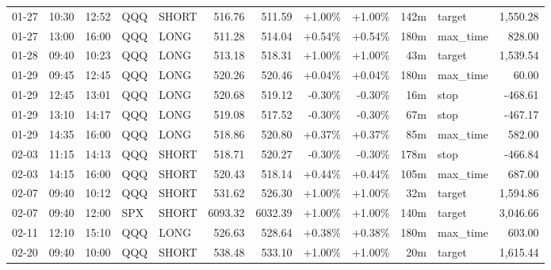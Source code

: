 \documentclass[11pt,a4paper,twoside]{article}
\begin{document}
\begin{center}
\begin{longtable}{>{\color{txtmain}}l l l l l r r r r r >{\color{txtmain}}l r}
01-27 & 10:30 & 12:52 & QQQ & SHORT & 516.76 & 511.59 & \textcolor{wingreen}{+1.00\%} & \textcolor{wingreen}{+1.00\%} & 142m & target & \textcolor{wingreen}{1,550.28} \\
01-27 & 13:00 & 16:00 & QQQ & LONG & 511.28 & 514.04 & \textcolor{wingreen}{+0.54\%} & \textcolor{wingreen}{+0.54\%} & 180m & max\_time & \textcolor{wingreen}{828.00} \\
01-28 & 09:40 & 10:23 & QQQ & LONG & 513.18 & 518.31 & \textcolor{wingreen}{+1.00\%} & \textcolor{wingreen}{+1.00\%} & 43m & target & \textcolor{wingreen}{1,539.54} \\
01-29 & 09:45 & 12:45 & QQQ & LONG & 520.26 & 520.46 & \textcolor{wingreen}{+0.04\%} & \textcolor{wingreen}{+0.04\%} & 180m & max\_time & \textcolor{wingreen}{60.00} \\
01-29 & 12:45 & 13:01 & QQQ & LONG & 520.68 & 519.12 & \textcolor{lossred}{-0.30\%} & \textcolor{lossred}{-0.30\%} & 16m & stop & \textcolor{lossred}{-468.61} \\
01-29 & 13:10 & 14:17 & QQQ & LONG & 519.08 & 517.52 & \textcolor{lossred}{-0.30\%} & \textcolor{lossred}{-0.30\%} & 67m & stop & \textcolor{lossred}{-467.17} \\
01-29 & 14:35 & 16:00 & QQQ & LONG & 518.86 & 520.80 & \textcolor{wingreen}{+0.37\%} & \textcolor{wingreen}{+0.37\%} & 85m & max\_time & \textcolor{wingreen}{582.00} \\
02-03 & 11:15 & 14:13 & QQQ & SHORT & 518.71 & 520.27 & \textcolor{lossred}{-0.30\%} & \textcolor{lossred}{-0.30\%} & 178m & stop & \textcolor{lossred}{-466.84} \\
02-03 & 14:15 & 16:00 & QQQ & SHORT & 520.43 & 518.14 & \textcolor{wingreen}{+0.44\%} & \textcolor{wingreen}{+0.44\%} & 105m & max\_time & \textcolor{wingreen}{687.00} \\
02-07 & 09:40 & 10:12 & QQQ & SHORT & 531.62 & 526.30 & \textcolor{wingreen}{+1.00\%} & \textcolor{wingreen}{+1.00\%} & 32m & target & \textcolor{wingreen}{1,594.86} \\
02-07 & 09:40 & 12:00 & SPX & SHORT & 6093.32 & 6032.39 & \textcolor{wingreen}{+1.00\%} & \textcolor{wingreen}{+1.00\%} & 140m & target & \textcolor{wingreen}{3,046.66} \\
02-11 & 12:10 & 15:10 & QQQ & LONG & 526.63 & 528.64 & \textcolor{wingreen}{+0.38\%} & \textcolor{wingreen}{+0.38\%} & 180m & max\_time & \textcolor{wingreen}{603.00} \\
02-20 & 09:40 & 10:00 & QQQ & SHORT & 538.48 & 533.10 & \textcolor{wingreen}{+1.00\%} & \textcolor{wingreen}{+1.00\%} & 20m & target & \textcolor{wingreen}{1,615.44} \\

\end{longtable}
\end{center}
\end{document}
